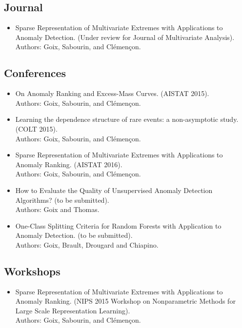 \begin{listpublis}

\subsection*{Journal}
\begin{itemize}
\item Sparse Representation of Multivariate Extremes with Applications to Anomaly Detection. (Under review for Journal of Multivariate Analysis).\\
Authors: Goix, Sabourin, and Clémençon.
\end{itemize}

\subsection*{Conferences}
\begin{itemize}
\item On Anomaly Ranking and Excess-Mass Curves. (AISTAT 2015).\\
Authors: Goix, Sabourin, and Clémençon. 

\item Learning the dependence structure of rare events: a non-asymptotic study. (COLT 2015).\\
Authors: Goix, Sabourin, and Clémençon.

\item Sparse Representation of Multivariate Extremes with Applications to Anomaly Ranking. (AISTAT 2016).\\
Authors: Goix, Sabourin, and Clémençon.

\item How to Evaluate the Quality of Unsupervised Anomaly Detection Algorithms? (to be submitted).\\ Authors: Goix and Thomas. 

\item One-Class Splitting Criteria for Random Forests with Application to Anomaly Detection. (to be submitted).\\
Authors: Goix, Brault, Drougard and Chiapino.
\end{itemize}


\subsection*{Workshops}
\begin{itemize}
\item Sparse Representation of Multivariate Extremes with Applications to Anomaly Ranking. (NIPS 2015 Workshop on Nonparametric Methods for Large Scale Representation Learning).\\
Authors: Goix, Sabourin, and Clémençon.


\end{itemize}
\end{listpublis}
